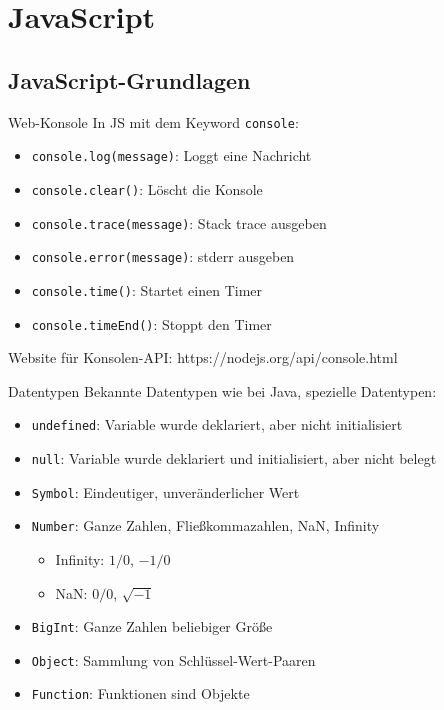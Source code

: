 \section{JavaScript}

\subsection{JavaScript-Grundlagen}
\begin{code}{Web-Konsole}
    In JS mit dem Keyword \texttt{console}:
    \begin{itemize}
        \item \texttt{console.log(message)}: Loggt eine Nachricht
        \item \texttt{console.clear()}: Löscht die Konsole
        \item \texttt{console.trace(message)}: Stack trace ausgeben
        \item \texttt{console.error(message)}: stderr ausgeben
        \item \texttt{console.time()}: Startet einen Timer
        \item \texttt{console.timeEnd()}: Stoppt den Timer
    \end{itemize}
    Website für Konsolen-API: https://nodejs.org/api/console.html
\end{code}

\begin{definition}{Datentypen}
    Bekannte Datentypen wie bei Java, spezielle Datentypen:
    \begin{itemize}
        \item \texttt{undefined}: Variable wurde deklariert, aber nicht initialisiert
        \item \texttt{null}: Variable wurde deklariert und initialisiert, aber nicht belegt
        \item \texttt{Symbol}: Eindeutiger, unveränderlicher Wert
        \item \texttt{Number}: Ganze Zahlen, Fließkommazahlen, NaN, Infinity
        \begin{itemize}
            \item Infinity: $1/0$, $-1/0$
            \item NaN: $0/0$, $\sqrt{-1}$
        \end{itemize}
        \item \texttt{BigInt}: Ganze Zahlen beliebiger Größe
        \item \texttt{Object}: Sammlung von Schlüssel-Wert-Paaren
        \item \texttt{Function}: Funktionen sind Objekte
    \end{itemize}
\end{definition}

